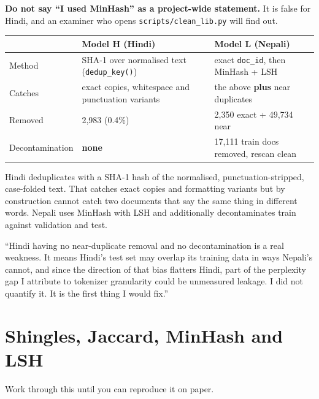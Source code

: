 \documentclass[11pt]{report}
\begin{document}
\begin{trap}
\textbf{Do not say ``I used MinHash'' as a project-wide statement.} It is false
for Hindi, and an examiner who opens \texttt{scripts/clean\_lib.py} will find
out.
\end{trap}

\begin{center}\small
\begin{tabular}{lp{5.1cm}p{5.1cm}}
\toprule
& \textbf{Model H (Hindi)} & \textbf{Model L (Nepali)} \\
\midrule
Method & SHA-1 over normalised text (\texttt{dedup\_key()}) & exact \texttt{doc\_id}, then MinHash + LSH \\
Catches & exact copies, whitespace and punctuation variants & the above \textbf{plus} near duplicates \\
Removed & 2,983 (0.4\%) & 2,350 exact + 49,734 near \\
Decontamination & \textbf{none} & 17,111 train docs removed, rescan clean \\
\bottomrule
\end{tabular}
\end{center}

\begin{shortans}
Hindi deduplicates with a SHA-1 hash of the normalised, punctuation-stripped,
case-folded text. That catches exact copies and formatting variants but by
construction cannot catch two documents that say the same thing in different
words. Nepali uses MinHash with LSH and additionally decontaminates train
against validation and test.
\end{shortans}

\begin{trap}
``Hindi having no near-duplicate removal and no decontamination is a real
weakness. It means Hindi's test set may overlap its training data in ways
Nepali's cannot, and since the direction of that bias flatters Hindi, part of
the perplexity gap I attribute to tokenizer granularity could be unmeasured
leakage. I did not quantify it. It is the first thing I would fix.''
\end{trap}

\section{Shingles, Jaccard, MinHash and LSH}

Work through this until you can reproduce it on paper.
\end{document}
